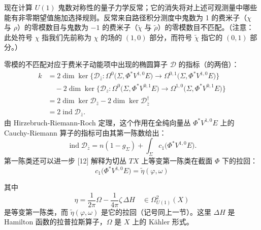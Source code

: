 
现在计算 $U(1)$ 鬼数对称性的量子力学反常；它的消失将对上述可观测量中哪些能有非零期望值施加选择规则。反常来自路径积分测度中鬼数为 1 的费米子（$\chi$ 与 $\rho$）的零模数目与鬼数为 $-1$ 的费米子（$\tilde\chi$ 与 $\tilde\rho$）的零模数目不匹配。（注意：此处符号 $\chi$ 指我们先前称为 $\chi$ 的场的 $(1,0)$ 部分，而符号 $\tilde\chi$ 指它的 $(0,1)$ 部分。）

零模的不匹配对应于费米子动能项中出现的椭圆算子 $\mathcal{D}$ 的指标（的两倍）：
\begin{align*}
k&=2\dim\ker\Big\{\mathcal{D}_{\bar z}:\Omega^0\big(\Sigma,\Phi^*V^{1,0}E\big)\to\Omega^{0,1}\big(\Sigma,\Phi^*V^{1,0}E\big)\Big\}\\
&\quad-2\dim\ker\Big\{\mathcal{D}_z:\Omega^0\big(\Sigma,\Phi^*V^{0,1}E\big)\to\Omega^{1,0}\big(\Sigma,\Phi^*V^{0,1}E\big)\Big\}\\
&=2\dim\ker\mathcal{D}_{\bar z}-2\dim\ker\mathcal{D}_{\bar z}^\dagger\\
&=2\operatorname{ind}\mathcal{D}_{\bar z}.
\end{align*}
由 Hirzebruch-Riemann-Roch 定理，这个作用在全纯向量丛 $\Phi^*V^{1,0}E$ 上的 Cauchy-Riemann 算子的指标可由其第一陈数给出：
\[
\operatorname{ind}\mathcal{D}_{\bar z}=n(1-g_\Sigma)+\int_\Sigma c_1\big(\Phi^*V^{1,0}E\big).
\]
第一陈类还可以进一步 [12] 解释为切丛 $TX$ 上等变第一陈类在截面 $\Phi$ 下的拉回：
\[
c_1\big(\Phi^*V^{1,0}E\big)=\tilde\eta(\varphi,\omega)
\]


其中
\[
\eta=\frac{1}{2\pi}\Omega-\frac{1}{4\pi}\zeta\,\Delta H\quad\in\Omega^2_{U(1)}(X)
\]
是等变第一陈类，而 $\tilde\eta(\varphi,\omega)$ 是它的拉回（记号同上一节）。这里 $\Delta H$ 是 Hamilton 函数的拉普拉斯算子，$\Omega$ 是 $X$ 上的 Kähler 形式。

